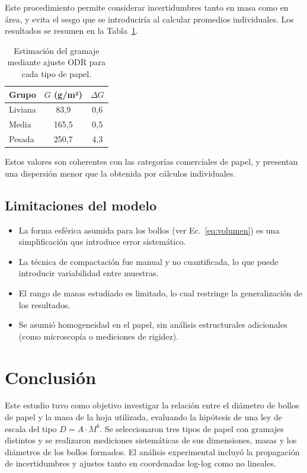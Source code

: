 \documentclass[12pt,a4]{article}
\begin{document}
Este procedimiento permite considerar incertidumbres tanto en masa como en área, y evita el sesgo que se introduciría al calcular promedios individuales. Los resultados se resumen en la Tabla~\ref{tab:gramaje}.

\begin{table}[H]
\centering
\begin{tabular}{@{}lcc@{}}
\toprule
\textbf{Grupo} & \( G \) (g/m²) & \( \Delta G \) \\
\midrule
Liviana & 83{,}9 & 0{,}6 \\
Media   & 165{,}5 & 0{,}5 \\
Pesada  & 250{,}7 & 4{,}3 \\
\bottomrule
\end{tabular}
\caption{Estimación del gramaje mediante ajuste ODR para cada tipo de papel.}
\label{tab:gramaje}
\end{table}

Estos valores son coherentes con las categorías comerciales de papel, y presentan una dispersión menor que la obtenida por cálculos individuales.

\subsection{Limitaciones del modelo}

\begin{itemize}
    \item La forma esférica asumida para los bollos (ver Ec.~\eqref{eq:volumen}) es una simplificación que introduce error sistemático.
    \item La técnica de compactación fue manual y no cuantificada, lo que puede introducir variabilidad entre muestras.
    \item El rango de masas estudiado es limitado, lo cual restringe la generalización de los resultados.
    \item Se asumió homogeneidad en el papel, sin análisis estructurales adicionales (como microscopía o mediciones de rigidez).
\end{itemize}

\section{Conclusión}

Este estudio tuvo como objetivo investigar la relación entre el diámetro de bollos de papel y la masa de la hoja utilizada, evaluando la hipótesis de una ley de escala del tipo \( D = A \cdot M^b \). Se seleccionaron tres tipos de papel con gramajes distintos y se realizaron mediciones sistemáticas de sus dimensiones, masas y los diámetros de los bollos formados. El análisis experimental incluyó la propagación de incertidumbres y ajustes tanto en coordenadas log-log como no lineales.
\end{document}

